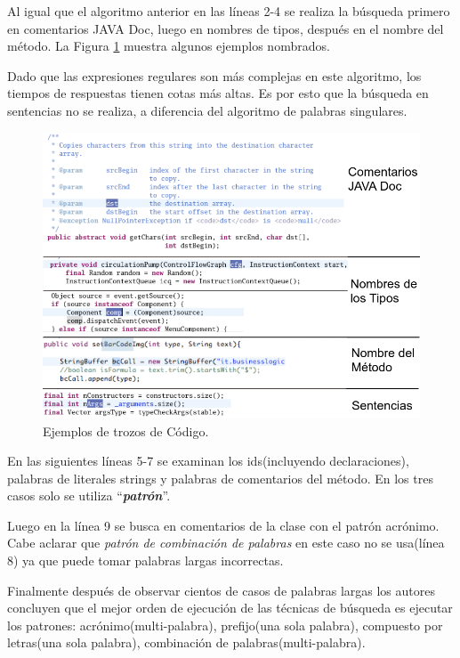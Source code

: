 \documentclass[a4paper,12pt]{report}
\begin{document}
Al igual que el algoritmo anterior en las líneas 2-4 se realiza la búsqueda primero en comentarios JAVA Doc, luego en nombres de tipos, después en el nombre del método. La Figura \ref{exp3} muestra algunos ejemplos nombrados.

Dado que las expresiones regulares son más complejas en este algoritmo, los tiempos de respuestas tienen cotas más altas. Es por esto que la búsqueda en sentencias no se realiza, a diferencia del algoritmo de palabras singulares.

\begin{figure}[t] %
\centering
\includegraphics[scale=0.7]{./exp_3.png}
\caption{Ejemplos de trozos de Código.}
\label{exp3}
\end{figure}

En las siguientes líneas 5-7 se examinan los ids(incluyendo declaraciones), palabras de literales strings y palabras de comentarios del método. En los tres casos solo se utiliza “\textit{\textbf{patrón}}”.

Luego en la línea 9 se busca en comentarios de la clase con el patrón acrónimo. Cabe aclarar que \textit{patrón de combinación de palabras} en este caso no se usa(línea 8) ya que puede tomar palabras largas incorrectas.

Finalmente después de observar cientos de casos de palabras largas los autores concluyen que el mejor orden de ejecución de las técnicas de búsqueda es ejecutar los patrones: acrónimo(multi-palabra), prefijo(una sola palabra), compuesto por letras(una sola palabra), combinación de palabras(multi-palabra).
\end{document}
